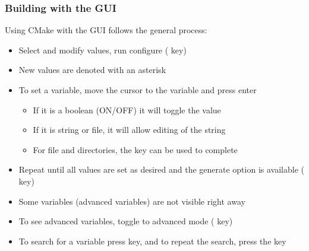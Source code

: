 \documentclass[letterpaper,10pt,english]{sphinxmanual}
\begin{document}
\subsubsection{Building with the GUI}
\label{Install:building-with-the-gui}\label{Install:index-2}
Using CMake with the  GUI follows the general process:
\begin{itemize}
\item {} 
Select and modify values, run configure ( key)

\item {} 
New values are denoted with an asterisk

\item {} 
To set a variable, move the cursor to the variable and press enter
\begin{itemize}
\item {} 
If it is a boolean (ON/OFF) it will toggle the value

\item {} 
If it is string or file, it will allow editing of the string

\item {} 
For file and directories, the  key can be used to complete

\end{itemize}

\item {} 
Repeat until all values are set as desired and the generate option
is available ( key)

\item {} 
Some variables (advanced variables) are not visible right away

\item {} 
To see advanced variables, toggle to advanced mode ( key)

\item {} 
To search for a variable press \code{/} key, and to repeat the search,
press the  key

\end{itemize}
\end{document}
